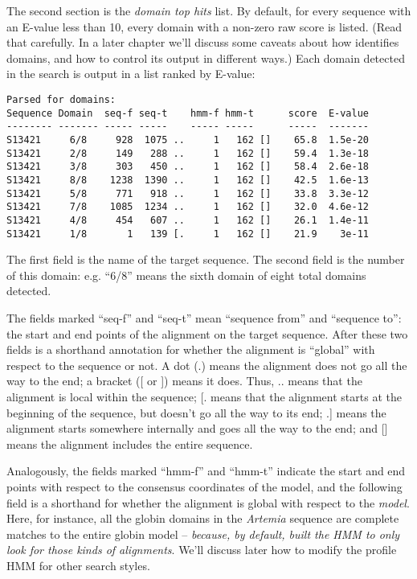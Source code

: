 The second section is the {\em domain top hits} list. By default, for
every sequence with an E-value less than 10, every domain with a
non-zero raw score is listed. (Read that carefully. In a later chapter
we'll discuss some caveats about how  identifies
domains, and how to control its output in different ways.) Each domain
detected in the search is output in a list ranked by E-value:

{\small\begin{verbatim}
Parsed for domains:
Sequence Domain  seq-f seq-t    hmm-f hmm-t      score  E-value
-------- ------- ----- -----    ----- -----      -----  -------
S13421     6/8     928  1075 ..     1   162 []    65.8  1.5e-20
S13421     2/8     149   288 ..     1   162 []    59.4  1.3e-18
S13421     3/8     303   450 ..     1   162 []    58.4  2.6e-18
S13421     8/8    1238  1390 ..     1   162 []    42.5  1.6e-13
S13421     5/8     771   918 ..     1   162 []    33.8  3.3e-12
S13421     7/8    1085  1234 ..     1   162 []    32.0  4.6e-12
S13421     4/8     454   607 ..     1   162 []    26.1  1.4e-11
S13421     1/8       1   139 [.     1   162 []    21.9    3e-11
\end{verbatim}}

The first field is the name of the target sequence. The second field
is the number of this domain: e.g. ``6/8'' means the sixth domain of
eight total domains detected. 

The fields marked ``seq-f'' and ``seq-t'' mean ``sequence from'' and
``sequence to'': the start and end points of the alignment on the
target sequence. After these two fields is a shorthand annotation for
whether the alignment is ``global'' with respect to the sequence or
not. A dot (.) means the alignment does not go all the way to the end;
a bracket ([ or ]) means it does. Thus, .. means that the alignment is
local within the sequence; [. means that the alignment starts at the
beginning of the sequence, but doesn't go all the way to its end; .]
means the alignment starts somewhere internally and goes all the way
to the end; and [] means the alignment includes the entire sequence.

Analogously, the fields marked ``hmm-f'' and ``hmm-t'' indicate the
start and end points with respect to the consensus coordinates of the
model, and the following field is a shorthand for whether the
alignment is global with respect to the {\em model}. Here, for
instance, all the globin domains in the {\em Artemia} sequence are
complete matches to the entire globin model -- {\em because, by
default,  built the HMM to only look for those kinds of
alignments}. We'll discuss later how to modify the profile HMM for
other search styles.

